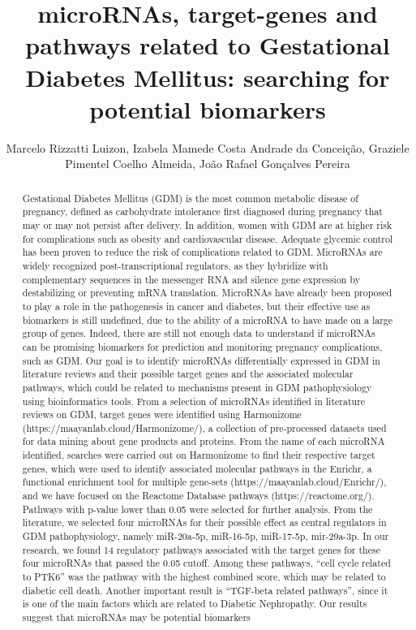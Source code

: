 \documentclass[twoside]{article}
\title{\vspace{-15mm}\fontsize{24pt}{10pt}\selectfont\textbf{ microRNAs,  target-genes and pathways related to Gestational Diabetes Mellitus: searching for potential biomarkers }} %
\author{ Marcelo Rizzatti Luizon,  Izabela Mamede Costa Andrade da Concei\c{c}\~ao,  Graziele Pimentel Coelho Almeida,  Jo\~ao Rafael Gon\c{c}alves Pereira }
\affil{ UNIVERSIDADE FEDERAL DE MINAS GERAIS,  UFMG }
\date{}
\begin{document}
  
  
  \maketitle %
  
  
  \thispagestyle{fancy} %
  
  
  \begin{abstract}
  Gestational Diabetes Mellitus (GDM) is the most common metabolic disease of pregnancy,  defined as carbohydrate intolerance first diagnosed during pregnancy that may or may not persist after delivery. In addition,  women with GDM are at higher risk for complications such as obesity and cardiovascular disease. Adequate glycemic control has been proven to reduce the risk of complications related to GDM. MicroRNAs are widely recognized post-transcriptional regulators,  as they hybridize with complementary sequences in the messenger RNA and silence gene expression by destabilizing or preventing mRNA translation. MicroRNAs have already been proposed to play a role in the pathogenesis in cancer and diabetes,  but their effective use as biomarkers is still undefined,  due to the ability of a microRNA to have made on a large group of genes. Indeed,  there are still not enough data to understand if microRNAs can be promising biomarkers for prediction and monitoring pregnancy complications,  such as GDM. Our goal is to identify microRNAs differentially expressed in GDM in literature reviews and their possible target genes and the associated molecular pathways,  which could be related to mechanisms present in GDM pathophysiology using bioinformatics tools. From a selection of microRNAs identified in literature reviews on GDM,  target genes were identified using Harmonizome (https://maayanlab.cloud/Harmonizome/),  a collection of pre-processed datasets used for data mining about gene products and proteins. From the name of each microRNA identified,  searches were carried out on Harmonizome to find their respective target genes,  which were used to identify associated molecular pathways in the Enrichr,  a functional enrichment tool for multiple gene-sets (https://maayanlab.cloud/Enrichr/),  and we have focused on the Reactome Database pathways (https://reactome.org/). Pathways with p-value lower than 0.05 were selected for further analysis. From the literature,  we selected four microRNAs for their possible effect as central regulators in GDM pathophysiology,  namely miR-20a-5p,  miR-16-5p,  miR-17-5p,  mir-29a-3p. In our research,  we found 14 regulatory pathways associated with the target genes for these four microRNAs that passed the 0.05 cutoff. Among these pathways,  “cell cycle related to PTK6” was the pathway with the highest combined score,  which may be related to diabetic cell death. Another important result is “TGF-beta related pathways”,  since it is one of the main factors which are related to Diabetic Nephropathy. Our results suggest that microRNAs may be potential biomarkers 
\end{abstract}
\end{document}
